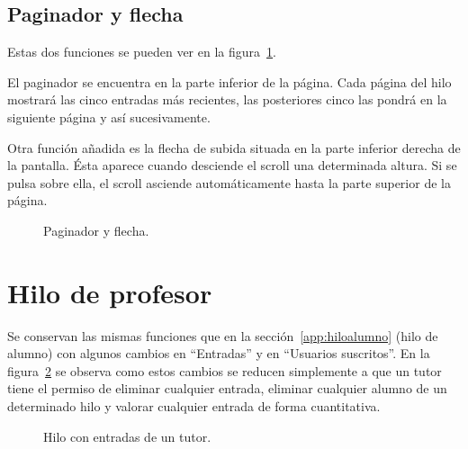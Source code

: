 \documentclass[a4paper, 12pt]{book}
\begin{document}
\subsection{Paginador y flecha}
Estas dos funciones se pueden ver en la figura~\ref{figura:hiloalumno5}.

El paginador se encuentra en la parte inferior de la p\'agina. Cada p\'agina del hilo mostrar\'a las cinco entradas m\'as recientes, las posteriores cinco 
las pondr\'a en la siguiente p\'agina y as\'i sucesivamente.

Otra funci\'on a\~nadida es la flecha de subida situada en la parte inferior derecha de la pantalla. \'Esta aparece cuando desciende el scroll una 
determinada altura. Si se pulsa sobre ella, el scroll asciende autom\'aticamente hasta la parte superior de la p\'agina.
\begin{figure}[htbp] 
  \centering
  \caption{Paginador y flecha.}
  \label{figura:hiloalumno5}
\end{figure}

\section{Hilo de profesor}
Se conservan las mismas funciones que en la secci\'on~\ref{app:hiloalumno} (hilo de alumno) con algunos cambios en ``Entradas'' y en ``Usuarios 
suscritos''. En la figura~\ref{figura:hiloprofesor} se observa como estos cambios se reducen simplemente a que un tutor tiene el permiso de eliminar 
cualquier entrada, eliminar cualquier alumno de un determinado hilo y valorar cualquier entrada de forma cuantitativa.
\begin{figure}[htbp] 
  \centering
  \caption{Hilo con entradas de un tutor.}
  \label{figura:hiloprofesor}
\end{figure}
\end{document}

